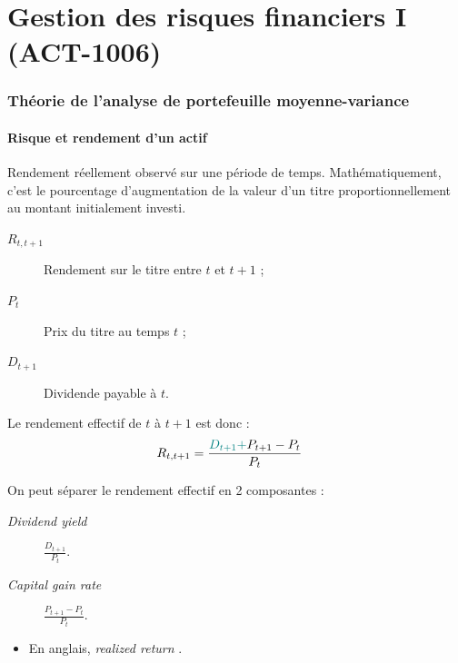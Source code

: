 \documentclass[10pt, french]{article}
\begin{document}
\part{Gestion des risques financiers I (ACT-1006)}
\begin{multicols*}{2}

\setcounter{section}{6}
\section{Théorie de l'analyse de portefeuille moyenne-variance}
\subsection{Risque et rendement d'un actif}
\begin{definitionNOHFILL}
Rendement réellement observé sur une période de temps. Mathématiquement, c'est le pourcentage d'augmentation de la valeur d'un titre proportionnellement au montant initialement investi.

\begin{distributions}[Notation]
\begin{description}
	\item[$R_{t, t + 1}$]	Rendement sur le titre entre $t$ et $t + 1$ ;
	\item[$P_{t}$]	Prix du titre au temps $t$ ;
	\item[$D_{t + 1}$]	Dividende payable à $t$.
\end{description}
\end{distributions}

Le rendement effectif de $t$ à $t + 1$ est donc :
\begin{align*}
R_{t, t + 1}
	&=	\frac{{\color{teal}D_{t + 1} + }P_{t + 1} - P_{t}}{P_{t}}
\end{align*}

On peut séparer le rendement effectif en 2 composantes :
\begin{description}
	\item[\og \textit{Dividend yield} \fg{}]	$\tfrac{D_{t + 1}}{P_{t}}$.
	\item[\og \textit{Capital gain rate} \fg{}]	$\tfrac{P_{t + 1} - P_{t}}{P_{t}}$.
\end{description}

\tcbline

\begin{itemize}
	\item	En anglais, \og \textit{realized return} \fg{}.
\end{itemize}



\end{definitionNOHFILL}
\end{multicols*}
\end{document}
